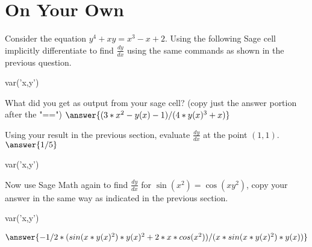 \documentclass{ximera}
\begin{document}
\section{On Your Own}
Consider the equation $y^4+xy=x^3-x+2$. Using the following Sage cell implicitly differentiate to find $\frac{dy}{dx}$ using the same commands as shown in the previous question.
\begin{onlineOnly}
\begin{sageCell}
var('x,y')
\end{sageCell}
\end{onlineOnly}
\begin{question}
What did you get as output from your sage cell? (copy just the answer portion after the "==") $\answer{(3*x^2 - y(x) - 1)/(4*y(x)^3 + x)}$
\end{question}
\begin{question}
Using your result in the previous section, evaluate $\frac{dy}{dx}$ at the point $(1,1)$.
$\answer{1/5}$
\end{question}
\begin{question}
\begin{onlineOnly}
\begin{sageCell}
var('x,y')

\end{sageCell}
\end{onlineOnly}
Now use Sage Math again to find $\frac{dy}{dx}$ for  $\sin(x^2)=\cos(xy^2)$, copy your answer in the same way as indicated in the previous section.
\begin{onlineOnly}
\begin{sageCell}
var('x,y')
\end{sageCell}
\end{onlineOnly}
$\answer{-1/2*(sin(x*y(x)^2)*y(x)^2 + 2*x*cos(x^2))/(x*sin(x*y(x)^2)*y(x))}$
\end{question}
\end{document}
